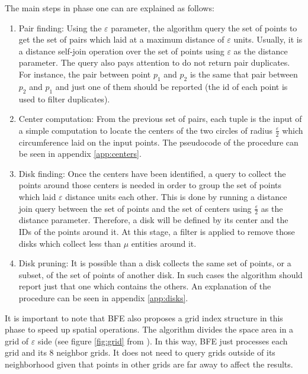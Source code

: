 \documentclass[journal,onecolumn]{IEEEtran}
\begin{document}
The main steps in phase one can are explained as follows:
\begin{enumerate}
    \item Pair finding:  Using the $\varepsilon$ parameter, the algorithm query the set of points to get the set of pairs which laid at a maximum distance of $\varepsilon$ units.  Usually, it is a distance self-join operation over the set of points using $\varepsilon$ as the distance parameter.  The query also pays attention to do not return pair duplicates.  For instance, the pair between point $p_1$ and $p_2$ is the same that pair between $p_2$ and $p_1$ and just one of them should be reported (the id of each point is used to filter duplicates).
    \item Center computation:  From the previous set of pairs, each tuple is the input of a simple computation to locate the centers of the two circles of radius $\frac{\varepsilon}{2}$ which circumference laid on the input points.  The pseudocode of the procedure can be seen in appendix \ref{app:centers}.
    \item Disk finding: Once the centers have been identified, a query to collect the points around those centers is needed in order to group the set of points which laid $\varepsilon$ distance units each other.  This is done by running a distance join query between the set of points and the set of centers using $\frac{\varepsilon}{2}$ as the distance parameter. Therefore, a disk will be defined by its center and the IDs of the points around it. At this stage, a filter is applied to remove those disks which collect less than $\mu$ entities around it.
    \item Disk pruning: It is possible than a disk collects the same set of points, or a subset, of the set of points of another disk.  In such cases the algorithm should report just that one which contains the others.  An explanation of the procedure can be seen in appendix \ref{app:disks}.
\end{enumerate}

It is important to note that BFE also proposes a grid index structure in this phase to speed up spatial operations.  The algorithm divides the space area in a grid of $\varepsilon$ side (see figure \ref{fig:grid} from \cite{vieira_2009}).  In this way, BFE just processes each grid and its 8 neighbor grids.  It does not need to query grids outside of its neighborhood given that points in other grids are far away to affect the results.
\end{document}
